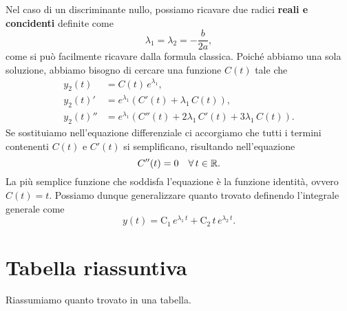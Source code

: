 \documentclass[../../analisi2]{subfiles}
\begin{document}
            Nel caso di un discriminante nullo, possiamo ricavare due radici \textbf{reali e concidenti} definite come
            \[
                \lambda_1 = \lambda_2 = -\frac{b}{2a},
            \]
            come si può facilmente ricavare dalla formula classica. Poiché abbiamo una sola soluzione, abbiamo bisogno di cercare una
            funzione \(C(t)\) tale che
            \begin{align*}
                y_2(t) &= C(t) \, e^{\lambda_1},\\
                y_2(t)' &= e^{\lambda_1} \left(C'(t) + \lambda_1 \, C(t)\right),\\
                y_2(t)'' &= e^{\lambda_1} \left(C''(t) + 2\lambda_1 \, C'(t) + 3\lambda_1 \, C(t)\right). %
            \end{align*}
            Se sostituiamo nell'equazione differenziale ci accorgiamo che tutti i termini contenenti \(C(t)\) e \(C'(t)\) si
            semplificano, risultando nell'equazione
            \[
                C''(t) = 0 \quad \forall \, t \in \mathbb{R}.
            \]
            La più semplice funzione che soddisfa l'equazione è la funzione identità, ovvero \(C(t) = t\). Possiamo dunque generalizzare
            quanto trovato definendo l'integrale generale come
            \[
                y(t) = \mathrm{C_1} \, e^{\lambda_1 \, t} + \mathrm{C_2} \, t \, e^{\lambda_2 \, t}.
            \]

        \section{Tabella riassuntiva}

            Riassumiamo quanto trovato in una tabella.
\end{document}
